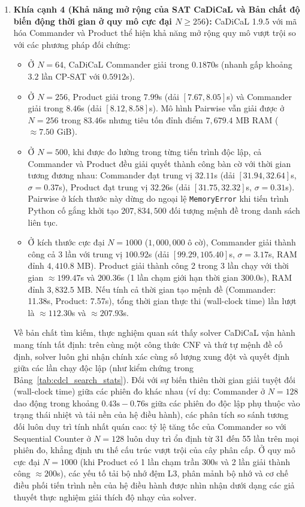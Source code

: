 \documentclass[11pt,a4paper]{article}
\begin{document}
\begin{enumerate}
    \item \textbf{Khía cạnh 4 (Khả năng mở rộng của SAT CaDiCaL và Bản chất độ biến động thời gian ở quy mô cực đại $N \ge 256$):} 
    CaDiCaL 1.9.5 với mã hóa Commander và Product thể hiện khả năng mở rộng quy mô vượt trội so với các phương pháp đối chứng:
    \begin{itemize}
        \item Ở $N=64$, CaDiCaL Commander giải trong $0.1870$s (nhanh gấp khoảng $3.2$ lần CP-SAT với $0.5912$s).
        \item Ở $N=256$, Product giải trong $7.99$s (dải $[7.67, 8.05]$s) và Commander giải trong $8.46$s (dải $[8.12, 8.58]$s). Mô hình Pairwise vẫn giải được ở $N=256$ trong $83.46$s nhưng tiêu tốn đỉnh điểm $7{,}679.4$ MB RAM ($\approx 7.50$ GiB).
        \item Ở $N=500$, khi được đo lường trong từng tiến trình độc lập, cả Commander và Product đều giải quyết thành công bàn cờ với thời gian tương đương nhau: Commander đạt trung vị $32.11$s (dải $[31.94, 32.64]$s, $\sigma = 0.37$s), Product đạt trung vị $32.26$s (dải $[31.75, 32.32]$s, $\sigma = 0.31$s). Pairwise ở kích thước này dừng do ngoại lệ \texttt{MemoryError} khi tiến trình Python cố gắng khởi tạo $207{,}834{,}500$ đối tượng mệnh đề trong danh sách liên tục.
        \item Ở kích thước cực đại $N=1000$ ($1{,}000{,}000$ ô cờ), Commander giải thành công cả 3 lần với trung vị $100.92$s (dải $[99.29, 105.40]$s, $\sigma = 3.17$s, RAM đỉnh $4{,}410.8$ MB). Product giải thành công 2 trong 3 lần chạy với thời gian $\approx 199.47$s và $200.36$s (1 lần chạm giới hạn thời gian $300.0$s), RAM đỉnh $3{,}832.5$ MB. Nếu tính cả thời gian tạo mệnh đề (Commander: 11.38s, Product: 7.57s), tổng thời gian thực thi (wall-clock time) lần lượt là $\approx 112.30$s và $\approx 207.93$s.
    \end{itemize}
    Về bản chất tìm kiếm, thực nghiệm quan sát thấy solver CaDiCaL vận hành mang tính tất định: trên cùng một công thức CNF và thứ tự mệnh đề cố định, solver luôn ghi nhận chính xác cùng số lượng xung đột và quyết định giữa các lần chạy độc lập (như kiểm chứng trong Bảng~\ref{tab:cdcl_search_stats}). Đối với sự biến thiên thời gian giải tuyệt đối (wall-clock time) giữa các phiên đo khác nhau (ví dụ: Commander ở $N=128$ dao động trong khoảng $0.43\text{s} - 0.76\text{s}$ giữa các phiên đo độc lập phụ thuộc vào trạng thái nhiệt và tải nền của hệ điều hành), các phân tích so sánh tương đối luôn duy trì tính nhất quán cao: tỷ lệ tăng tốc của Commander so với Sequential Counter ở $N=128$ luôn duy trì ổn định từ 31 đến 55 lần trên mọi phiên đo, khẳng định ưu thế cấu trúc vượt trội của cây phân cấp. Ở quy mô cực đại $N=1000$ (khi Product có 1 lần chạm trần 300s và 2 lần giải thành công $\approx 200$s), các yếu tố tải bộ nhớ đệm L3, phân mảnh bộ nhớ và cơ chế điều phối tiến trình nền của hệ điều hành được nhìn nhận dưới dạng các giả thuyết thực nghiệm giải thích độ nhạy của solver.
\end{enumerate}
\end{document}
